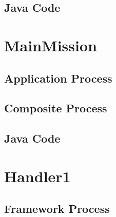 \documentclass{article}
\begin{document}
\begin{circusbox}

\end{circusbox}

\newpage

\subsection{Java Code}


\newpage


\section{MainMission}

\subsection{Application Process}

\begin{circusbox}

\end{circusbox}

\subsection{Composite Process}

\begin{circusbox}

\end{circusbox}

\newpage

\subsection{Java Code}


\newpage


\section{Handler1}

\subsection{Framework Process}
\end{document}
